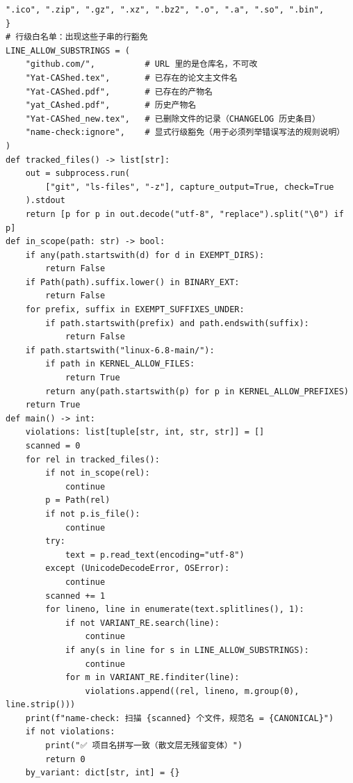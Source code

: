 \documentclass[10pt,a4paper]{article}
\newenvironment{yatpage}{\vspace*{0pt}}{\par}
\begin{document}
\begin{yatpage}
\begin{Verbatim}[fontsize=\fontsize{8.2}{9.8}\selectfont]
    ".ico", ".zip", ".gz", ".xz", ".bz2", ".o", ".a", ".so", ".bin",
}
# 行级白名单：出现这些子串的行豁免
LINE_ALLOW_SUBSTRINGS = (
    "github.com/",          # URL 里的是仓库名，不可改
    "Yat-CAShed.tex",       # 已存在的论文主文件名
    "Yat-CAShed.pdf",       # 已存在的产物名
    "yat_CAshed.pdf",       # 历史产物名
    "Yat-CAShed_new.tex",   # 已删除文件的记录（CHANGELOG 历史条目）
    "name-check:ignore",    # 显式行级豁免（用于必须列举错误写法的规则说明）
)
def tracked_files() -> list[str]:
    out = subprocess.run(
        ["git", "ls-files", "-z"], capture_output=True, check=True
    ).stdout
    return [p for p in out.decode("utf-8", "replace").split("\0") if p]
def in_scope(path: str) -> bool:
    if any(path.startswith(d) for d in EXEMPT_DIRS):
        return False
    if Path(path).suffix.lower() in BINARY_EXT:
        return False
    for prefix, suffix in EXEMPT_SUFFIXES_UNDER:
        if path.startswith(prefix) and path.endswith(suffix):
            return False
    if path.startswith("linux-6.8-main/"):
        if path in KERNEL_ALLOW_FILES:
            return True
        return any(path.startswith(p) for p in KERNEL_ALLOW_PREFIXES)
    return True
def main() -> int:
    violations: list[tuple[str, int, str, str]] = []
    scanned = 0
    for rel in tracked_files():
        if not in_scope(rel):
            continue
        p = Path(rel)
        if not p.is_file():
            continue
        try:
            text = p.read_text(encoding="utf-8")
        except (UnicodeDecodeError, OSError):
            continue
        scanned += 1
        for lineno, line in enumerate(text.splitlines(), 1):
            if not VARIANT_RE.search(line):
                continue
            if any(s in line for s in LINE_ALLOW_SUBSTRINGS):
                continue
            for m in VARIANT_RE.finditer(line):
                violations.append((rel, lineno, m.group(0), line.strip()))
    print(f"name-check: 扫描 {scanned} 个文件，规范名 = {CANONICAL}")
    if not violations:
        print("✅ 项目名拼写一致（散文层无残留变体）")
        return 0
    by_variant: dict[str, int] = {}
\end{Verbatim}
\end{yatpage}
\newpage
\end{document}
